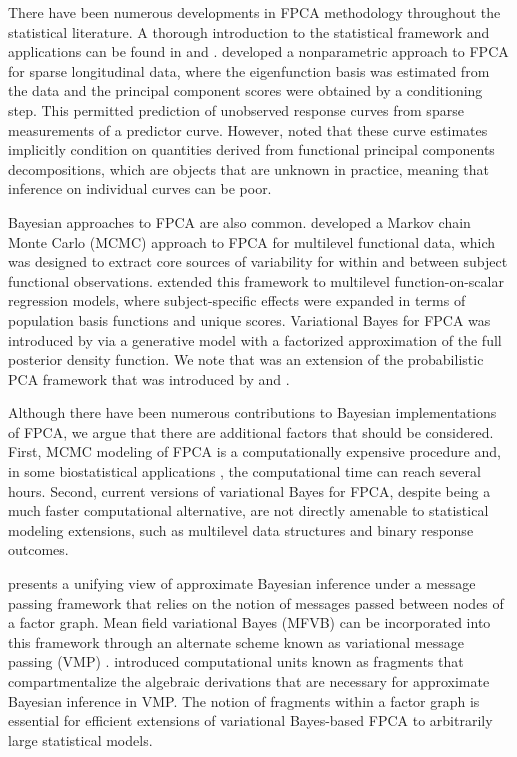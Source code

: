 \documentclass[12pt]{article}
\theoremstyle{plain}
\theoremstyle{definition}
\theoremstyle{remark}
\begin{document}
There have been numerous developments in FPCA methodology throughout the statistical literature.
A thorough introduction to the statistical framework and applications can be found in 
and .  developed a nonparametric approach to FPCA
for sparse longitudinal data, where the eigenfunction basis was estimated from the data and the
principal component scores were obtained by a conditioning step. This permitted
prediction of unobserved response curves from sparse measurements of a predictor curve. However,
 noted that these curve estimates implicitly condition on quantities derived from functional
principal components decompositions, which are objects that are unknown in practice, meaning that inference on
individual curves can be poor.

Bayesian approaches to FPCA are also common.  developed a Markov chain Monte Carlo (MCMC)
approach to FPCA for multilevel functional data, which was designed to extract core sources of variability for within and
between subject functional observations.  extended this framework to multilevel function-on-scalar
regression models, where subject-specific effects were expanded in terms of population basis functions and unique
scores. Variational Bayes for FPCA was introduced by  via a generative model with a
factorized approximation of the full posterior density function. We note that  was an extension
of the probabilistic PCA framework that was introduced by  and .

Although there have been numerous contributions to Bayesian implementations of FPCA, we argue that there are
additional factors that should be considered. First, MCMC modeling of FPCA is a computationally expensive
procedure and, in some biostatistical applications \cite{Goldsmith15}, the computational time can reach several
hours. Second, current versions of variational Bayes for FPCA, despite being a much faster computational alternative,
are not directly amenable to statistical modeling extensions, such as multilevel data structures and binary response
outcomes.

 presents a unifying view of approximate Bayesian inference under a message passing framework
that relies on the notion of messages passed between nodes of a factor graph. Mean field variational Bayes (MFVB)
can be incorporated into this framework through an alternate scheme known as variational message passing (VMP)
\cite{winn05}.  introduced computational units known as fragments that compartmentalize
the algebraic derivations that are necessary for approximate Bayesian inference in VMP. The notion of fragments
within a factor graph is essential for efficient extensions of variational Bayes-based FPCA to arbitrarily large statistical
models.
\end{document}
